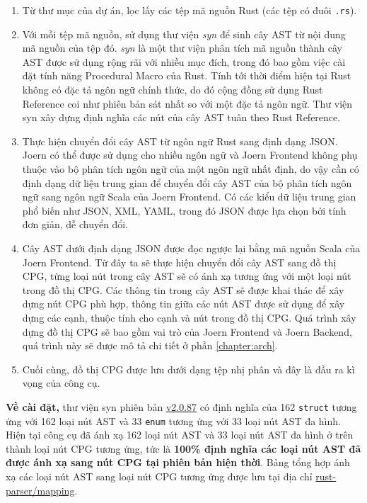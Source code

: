 \begin{enumerate}
	\item Từ thư mục của dự án, lọc lấy các tệp mã nguồn Rust (các tệp có đuôi \texttt{.rs}).
	\item Với mỗi tệp mã nguồn, sử dụng thư viện \textit{syn} \cite{synRust} để sinh cây AST từ nội dung mã nguồn của tệp đó.
	\textit{syn} là một thư viện phân tích mã nguồn thành cây AST được sử dụng rộng rãi với nhiều mục đích, trong đó bao gồm việc cài đặt tính năng Procedural Macro \cite{rustlangProceduralMacros} của Rust.
	Tính tới thời điểm hiện tại Rust không có đặc tả ngôn ngữ chính thức, do đó cộng đồng sử dụng Rust Reference \cite{rustReference} coi như phiên bản sát nhất so với một đặc tả ngôn ngữ.
	Thư viện syn xây dựng định nghĩa các nút của cây AST tuân theo Rust Reference.
	\item Thực hiện chuyển đổi cây AST từ ngôn ngữ Rust sang định dạng JSON.
	Joern có thể được sử dụng cho nhiều ngôn ngữ và Joern Frontend không phụ thuộc vào bộ phân tích ngôn ngữ của một ngôn ngữ nhất định, do vậy cần có định dạng dữ liệu trung gian để chuyển đổi cây AST của bộ phân tích ngôn ngữ sang ngôn ngữ Scala của Joern Frontend.
	Có các kiểu dữ liệu trung gian phổ biến như JSON, XML, YAML, trong đó JSON được lựa chọn bởi tính đơn giản, dễ chuyển đổi.
	\item Cây AST dưới định dạng JSON được đọc ngược lại bằng mã nguồn Scala của Joern Frontend.
	Từ đây ta sẽ thực hiện chuyển đổi cây AST sang đồ thị CPG, từng loại nút trong cây AST sẽ có ánh xạ tương ứng với một loại nút trong đồ thị CPG.
	Các thông tin trong cây AST sẽ được khai thác để xây dựng nút CPG phù hợp, thông tin giữa các nút AST được sử dụng để xây dựng các cạnh, thuộc tính cho cạnh và nút trong đồ thị CPG.
	Quá trình xây dựng đồ thị CPG sẽ bao gồm vai trò của Joern Frontend và Joern Backend, quá trình này sẽ được mô tả chi tiết ở phần \ref{chapter:arch}.
	\item Cuối cùng, đồ thị CPG được lưu dưới dạng tệp nhị phân và đây là đầu ra kì vọng của công cụ.
\end{enumerate}

\textbf{Về cài đặt,} thư viện syn phiên bản \href{https://docs.rs/syn/2.0.87/syn/}{v2.0.87} có định nghĩa của 162 \texttt{struct} tương ứng với 162 loại nút AST và 33 \texttt{enum} tương ứng với 33 loại nút AST đa hình.
Hiện tại công cụ đã ánh xạ 162 loại nút AST và 33 loại nút AST đa hình ở trên thành loại nút CPG tương ứng, tức là \textbf{100\% định nghĩa các loại nút AST đã được ánh xạ sang nút CPG tại phiên bản hiện thời}.
Bảng tổng hợp ánh xạ các loại nút AST sang loại nút CPG tương ứng được lưu tại địa chỉ \href{https://github.com/congnghiahieu/rust-parser/blob/master/docs/MAPPING.md}{rust-parser/mapping}.


